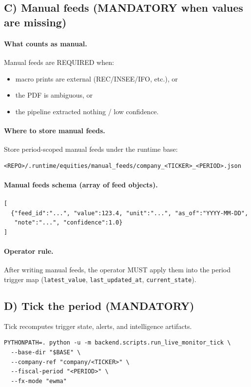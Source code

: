 \subsection*{C) Manual feeds (MANDATORY when values are missing)}
\paragraph{What counts as manual.}
Manual feeds are REQUIRED when:
\begin{itemize}
  \item macro prints are external (REC/INSEE/IFO, etc.), or
  \item the PDF is ambiguous, or
  \item the pipeline extracted nothing / low confidence.
\end{itemize}

\paragraph{Where to store manual feeds.}
Store period-scoped manual feeds under the runtime base:
\begin{verbatim}
<REPO>/.runtime/equities/manual_feeds/company_<TICKER>_<PERIOD>.json
\end{verbatim}

\paragraph{Manual feeds schema (array of feed objects).}
\begin{verbatim}
[
  {"feed_id":"...", "value":123.4, "unit":"...", "as_of":"YYYY-MM-DD",
   "note":"...", "confidence":1.0}
]
\end{verbatim}

\paragraph{Operator rule.}
After writing manual feeds, the operator MUST apply them into the period trigger map
(\texttt{latest\_value}, \texttt{last\_updated\_at}, \texttt{current\_state}).

\subsection*{D) Tick the period (MANDATORY)}
Tick recomputes trigger state, alerts, and intelligence artifacts.
\begin{verbatim}
PYTHONPATH=. python -u -m backend.scripts.run_live_monitor_tick \
  --base-dir "$BASE" \
  --company-ref "company/<TICKER>" \
  --fiscal-period "<PERIOD>" \
  --fx-mode "ewma"
\end{verbatim}

